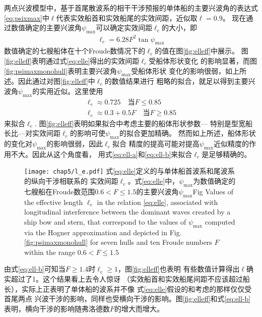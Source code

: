 两点兴波模型中，基于首尾散波系的相干干涉预报的单体船的主要兴波角的表达式
\eqref{eq:psixmax}中$\ell$代表实效船首和实效船尾的实效间距，近似取$\ell=0.9$。
现在通过数值确定的主要兴波角$\psi_{\max}$可以确定实效间距$\ell_e$的大小，即
\begin{eqnarray}
  \ell_e=6.28F^2\tan\psi_{\max}
  \label{eq:elle}
\end{eqnarray}
数值确定的七艘船体在十个Froude数情况下的$\ell_e$的值在图\ref{fig:elleff}中展示。
图\ref{fig:elleff}表明通过式\eqref{eq:elle}得出的实效间距$\ell_e$受船体形状变化
的影响显著，而图\ref{fig:psimaxmonohull}表明主要兴波角$\psi_{\max}$受船体形状
变化的影响很弱，如上所述。因此通过对图\ref{fig:elleff}中$\ell_e$的数值结果进行
粗略的拟合，就足以得到主要兴波角$\psi_{\max}$的实用近似。这里使用
\begin{subequations}\label{eq:ellfit}
\begin{eqnarray}
  \ell_e\approx0.725\quad\text{当}F\le0.85 \label{eq:ell-a}\\
  \ell_e\approx0.3+0.5F\quad\text{当}F\ge0.85 \label{eq:ell-b}
\end{eqnarray}
\end{subequations}
来拟合$\ell_e$. 图\ref{fig:elleff}表明如果拟合中考虑主要的船体形状参数---
特别是型宽船长比---对实效间距$\ell_e$的影响可使$\psi_{\max}$的拟合更加精确。
然而如上所述，船体形状的变化对$\psi_{\max}$的影响很弱，因此$\ell_e$拟合
精度的提高可能对提高$\psi_{\max}$近似精度的作用不大。因此从这个角度看，
用式\eqref{eq:ell-a}和\eqref{eq:ell-b}来拟合$\ell_e$是足够精确的。
%
\begin{figure}[htp]
  \centering
  \captionstyle{\centering}
  \texttt{[image: chap5/l\_e.pdf]}
  {式\eqref{eq:elle}定义的与单体船首波系和尾波系的纵向干涉相联系的
  实效间距$\ell_e$。式\eqref{eq:elle}中，$\psi_{\max}$为数值确定的
  七艘船在Froude数范围$0.6<F\le1.5$的主要兴波角$\psi_{\max}$}{Fig}
  {Values of the effective length $\ell_e$ in the relation \eqref{eq:elle},
  associated with longitudinal interference between the dominant waves created 
  by a ship bow and stern, that correspond to the values of $\psi_{\max}$
  computed via the Hogner approximation and depicted in 
  Fig.\eqref{fig:psimaxmonohull} for seven hulls and ten Froude numbers $F$
within the range $0.6 < F \le 1.5$}
\end{figure}
%

由式\eqref{eq:ell-b}可知当$F\ge1.4$时$\ell_e\ge1$，图\ref{fig:elleff}也表明
有些数值计算得出$\ell$确实超过了1。这个结果看上去令人惊讶
（实效船首和实效船尾间距不应该超过船长），实际上正表明了单体船的波系并不像
式\eqref{eq:elle}假设的和\parencite{Noblesse2014Why}考虑的那样仅仅受首尾两点
兴波干涉的影响，同样也受横向干涉的影响。图\ref{fig:elleff}和式\eqref{eq:ell-b}
表明，横向干涉的影响随弗洛德数$F$的增大而增大。

